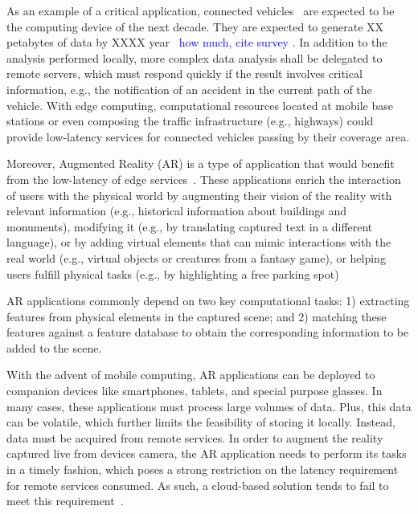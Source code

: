 As an example of a critical application, connected vehicles~\cite{} are expected to be the computing device of the next decade. They are expected to generate XX petabytes of data by XXXX year~\cite{connectedCars} \textcolor{blue}{how much, cite survey}
. In addition to the analysis performed locally, more complex data analysis shall be delegated to remote servers, which must respond quickly if the result involves critical information, e.g., the notification of an accident in the current path of the vehicle. With edge computing, computational resources located at mobile base stations or even composing the traffic infrastructure (e.g., highways) could provide low-latency services for connected vehicles passing by their coverage area.

Moreover, Augmented Reality (AR) is a type of application that would benefit from the low-latency of edge services~\cite{hu2015mobile,GarrigaMendonca2017}. These applications enrich the interaction of users with the physical
world by augmenting their vision of the reality with relevant information (e.g., historical information about buildings and monuments), modifying it (e.g., by translating captured text in a different language), or by adding virtual elements that can mimic interactions with the real world (e.g., virtual objects or creatures
from a fantasy game), or helping users fulfill physical tasks (e.g., by highlighting a free parking spot) 

AR applications commonly depend on two key computational tasks: 1) extracting features from physical elements in the captured scene; and 2) matching these features against a feature database to obtain the corresponding information to be added to the scene. 

With the advent of mobile computing, AR applications can be deployed to companion devices like smartphones, tablets, and special purpose glasses. In many cases, these applications must process large volumes of data. Plus, this data can be volatile, which further limits the feasibility of storing it locally. Instead, data must be acquired from remote services. In order to augment the reality captured live from devices camera, the AR application needs to perform its tasks in a timely fashion, which poses a strong restriction on the latency requirement for remote services consumed. As such, a cloud-based solution tends to fail to meet this requirement~\cite{ServerlessEdgeESOCC17}. 


